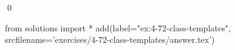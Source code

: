 
\begin{ex}
  \label{ex:4-72-class-templates}
  
  \qed
\end{ex}
\begin{python0}
from solutions import *
add(label="ex:4-72-class-templates",
    srcfilename='exercises/4-72-class-templates/answer.tex')
\end{python0}
